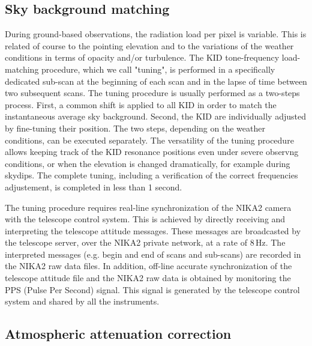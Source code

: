 \documentclass[]{aa} %
\begin{document}
\subsection{Sky background matching}
\label{Sky background matching}

During ground-based observations, the radiation load per pixel is variable. This is related of course to the pointing elevation and to the variations of the weather conditions in terms of opacity and/or turbulence. The KID tone-frequency load-matching procedure, which we call "tuning", is performed in a specifically dedicated sub-scan at the beginning of each scan and in the lapse of time between two subsequent scans. The tuning procedure is usually performed as a two-steps process. First, a common shift is applied to all KID in order to match the instantaneous average sky background. Second, the KID are individually adjusted by fine-tuning their position. The two steps, depending on the weather conditions, can be executed separately. The versatility of the tuning procedure allows keeping track of the KID resonance positions even under severe observng conditions, or when the elevation is changed dramatically, for example during skydips. The complete tuning, including a verification of the correct frequencies adjustement, is completed in less than 1 second. 

The tuning procedure requires real-line synchronization of the NIKA2 camera with the telescope control system. This is achieved by directly receiving and interpreting the telescope attitude messages. These messages are broadcasted by the telescope server, over the NIKA2 private network, at a rate of 8\,Hz. The interpreted messages (e.g. begin and end of scans and sub-scans) are recorded in the NIKA2 raw data files. In addition, off-line accurate synchronization of the telescope attitude file and the NIKA2 raw data is obtained by monitoring the PPS (Pulse Per Second) signal. This signal is generated by the telescope control system and shared by all the instruments.


\subsection{Atmospheric attenuation correction}
\label{Atmospheric attenuation correction}
\end{document}
